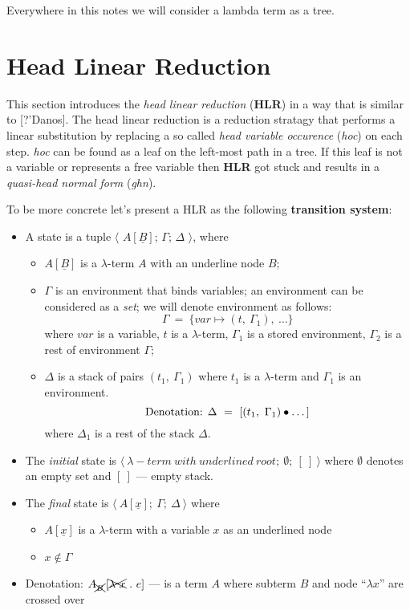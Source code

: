\documentclass[a4paper, 10pt]{article}
\newcommand{\InContext}[2]{{#1}\left[{#2}\right]}
\begin{document}
Everywhere in this notes we will consider a lambda term as a tree.

\section{Head Linear Reduction}

This section introduces the \emph{head linear reduction} (\textbf{HLR}) in a way that
is similar to [?'Danos].
The head linear reduction is a reduction stratagy that performs a linear substitution
by replacing a so called \emph{head variable occurence} (\emph{hoc}) on each step.
\emph{hoc} can be found as a leaf on the left-most path in a tree. If this leaf is not
a variable or represents a free variable then \textbf{HLR} got stuck and results in a
\emph{quasi-head normal form} (\emph{ghn}).

To be more concrete let's present a HLR as the following \textbf{transition system}:
\begin{itemize}
\item A state is a tuple $\langle$ $A[\underline{B}]$; $\Gamma$; $\Delta$ $\rangle$, where
  \begin{itemize}
  \item $A[\underline{B}]$ is a $\lambda$-term $A$ with an underline node $B$;
  \item $\Gamma$ is an environment that binds variables; an environment can be considered
    as a \emph{set}; we will denote environment as follows:
    $$\Gamma \ = \ \{var \mapsto (t,\ \Gamma_1),\ \dots\}$$ where
    $var$ is a variable, $t$ is a $\lambda$-term, $\Gamma_1$ is a stored environment,
    $\Gamma_2$ is a rest of environment $\Gamma$;
  \item $\Delta$ is a stack of pairs $(t_1, \ \Gamma_1)$ where $t_1$ is a $\lambda$-term and
    $\Gamma_1$ is an environment.
    $$\textnormal{Denotation: } \Delta \ = \ [ (t_1,\ \Gamma_1) \bullet \dots ]$$
    where $\Delta_1$ is a rest of the stack $\Delta$.
  \end{itemize}
\item The \emph{initial} state is $\langle\ \lambda-term\ with\ underlined\ root;\ \emptyset;\ [\ ]\ \rangle$
  where $\emptyset$ denotes an empty set and $[\ ]$ --- empty stack.
\item The \emph{final} state is $\langle\ A [\underline{x}];\ \Gamma;\ \Delta\ \rangle$ where
  \begin{itemize}
  \item $A [\underline{x}]$ is a $\lambda$-term with a variable $x$ as an underlined node
  \item $x \not\in \Gamma$
  \end{itemize}
\item Denotation: $\InContext{A_{\xcancel{B}}}{\xcancel{\lambda\ x}\ .\ e}$ ---
  is a term $A$ where subterm $B$  and node ``$\lambda x$'' are crossed over
\end{itemize}
\end{document}
